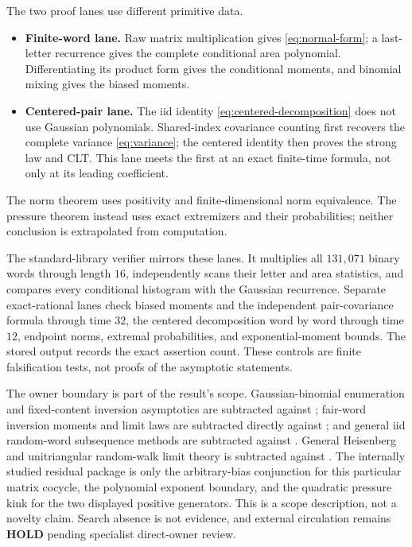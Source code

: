 \documentclass[11pt,a4paper]{amsart}
\theoremstyle{definition}
\theoremstyle{remark}
\begin{document}
The two proof lanes use different primitive data.
\begin{itemize}
\item \textbf{Finite-word lane.}  Raw matrix multiplication gives
      \eqref{eq:normal-form}; a last-letter recurrence gives the complete
      conditional area polynomial.  Differentiating its product form gives
      the conditional moments, and binomial mixing gives the biased moments.
\item \textbf{Centered-pair lane.}  The iid identity
      \eqref{eq:centered-decomposition} does not use Gaussian polynomials.
      Shared-index covariance counting first recovers the complete variance
      \eqref{eq:variance}; the centered identity then proves the strong law
      and CLT.  This lane meets the first at an exact finite-time formula,
      not only at its leading coefficient.
\end{itemize}
The norm theorem uses positivity and finite-dimensional norm equivalence.
The pressure theorem instead uses exact extremizers and their probabilities;
neither conclusion is extrapolated from computation.

The standard-library verifier mirrors these lanes.  It multiplies all
$131{,}071$ binary words through length $16$, independently scans their
letter and area statistics, and compares every conditional histogram with
the Gaussian recurrence.  Separate exact-rational lanes check biased moments
and the independent pair-covariance formula through time $32$, the centered
decomposition word by word through time $12$, endpoint norms, extremal
probabilities, and exponential-moment bounds.
The stored output records the exact assertion count.  These controls are
finite falsification tests, not proofs of the asymptotic statements.

The owner boundary is part of the result's scope.  Gaussian-binomial
enumeration and fixed-content inversion asymptotics are subtracted against
\cite{CanfieldJansonZeilberger2011,CanfieldJansonZeilberger2012}; fair-word
inversion moments and limit laws are subtracted directly against
\cite{Takacs1986,Janson2012}; and general iid random-word subsequence methods
are subtracted against \cite{IslakOzdemir2018}.  General Heisenberg and
unitriangular random-walk limit theory is subtracted against
\cite{DiaconisHough2021}.  The internally studied residual package is only
the arbitrary-bias conjunction for this particular matrix cocycle, the
polynomial exponent boundary, and the quadratic pressure kink for the two
displayed positive generators.  This is a scope description, not a novelty
claim.  Search absence is not evidence, and external circulation remains
\textbf{HOLD} pending specialist direct-owner review.
\end{document}
